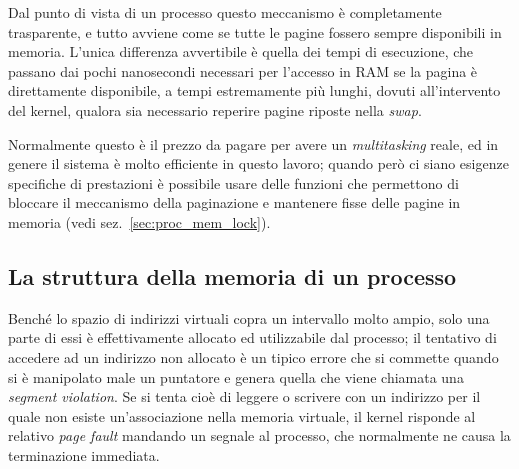 Dal punto di vista di un processo questo meccanismo è completamente
trasparente, e tutto avviene come se tutte le pagine fossero sempre
disponibili in memoria.  L'unica differenza avvertibile è quella dei tempi di
esecuzione, che passano dai pochi nanosecondi necessari per l'accesso in RAM
se la pagina è direttamente disponibile, a tempi estremamente più lunghi,
dovuti all'intervento del kernel, qualora sia necessario reperire pagine
riposte nella \textit{swap}.


Normalmente questo è il prezzo da pagare per avere un \textit{multitasking}
reale, ed in genere il sistema è molto efficiente in questo lavoro; quando
però ci siano esigenze specifiche di prestazioni è possibile usare delle
funzioni che permettono di bloccare il meccanismo della paginazione e
mantenere fisse delle pagine in memoria (vedi sez.~\ref{sec:proc_mem_lock}).



\subsection{La struttura della memoria di un processo}
\label{sec:proc_mem_layout}


Benché lo spazio di indirizzi virtuali copra un intervallo molto ampio, solo
una parte di essi è effettivamente allocato ed utilizzabile dal processo; il
tentativo di accedere ad un indirizzo non allocato è un tipico errore che si
commette quando si è manipolato male un puntatore e genera quella che viene
chiamata una \textit{segment violation}. Se si tenta cioè di leggere o
scrivere con un indirizzo per il quale non esiste un'associazione nella
memoria virtuale, il kernel risponde al relativo \textit{page fault} mandando
un segnale  al processo, che normalmente ne causa la
terminazione immediata.


